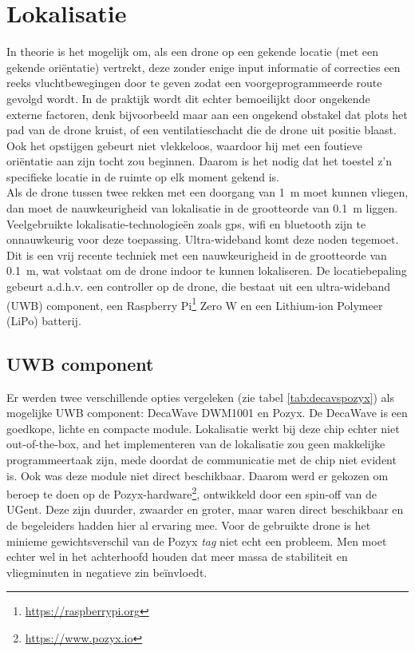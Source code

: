 
\section{Lokalisatie} \label{sec:localization}
In theorie is het mogelijk om, als een drone op een gekende locatie (met een gekende ori\"entatie) vertrekt, deze zonder enige input informatie of correcties een reeks vluchtbewegingen door te geven zodat een voorgeprogrammeerde route gevolgd wordt.
In de praktijk wordt dit echter bemoeilijkt door ongekende externe factoren, denk bijvoorbeeld maar aan een ongekend obstakel dat plots het pad van de drone kruist, of een ventilatieschacht die de drone uit positie blaast.
Ook het opstijgen gebeurt niet vlekkeloos, waardoor hij met een foutieve ori\"entatie aan zijn tocht zou beginnen.
Daarom is het nodig dat het toestel z'n specifieke locatie in de ruimte op elk moment gekend is.\\

Als de drone tussen twee rekken met een doorgang van \SI{1}{\m} moet kunnen vliegen, dan moet de nauwkeurigheid van lokalisatie in de grootteorde van \SI{0.1}{\m} liggen.
Veelgebruikte lokalisatie-technologieën zoals gps, wifi en bluetooth zijn te onnauwkeurig voor deze toepassing.
Ultra-wideband komt deze noden tegemoet.
Dit is een vrij recente techniek met een nauwkeurigheid in de grootteorde van \SI{0.1}{\m}, wat volstaat om de drone indoor te kunnen lokaliseren.
De locatiebepaling gebeurt a.d.h.v. een controller op de drone, die bestaat uit een ultra-wideband (UWB) component, een Raspberry Pi\footnote{\url{https://raspberrypi.org}} Zero W en een Lithium-ion Polymeer (LiPo) batterij.\\

\subsection{UWB component} \label{sec:uwb}
Er werden twee verschillende opties vergeleken (zie tabel \ref{tab:decavspozyx}) als mogelijke UWB component: DecaWave DWM1001 en Pozyx. De DecaWave is een goedkope, lichte en compacte module. Lokalisatie werkt bij deze chip echter niet out-of-the-box, and het implementeren van de lokalisatie zou geen makkelijke programmeertaak zijn, mede doordat de communicatie met de chip niet evident is. Ook was deze module niet direct beschikbaar. Daarom werd er gekozen om beroep te doen op de Pozyx-hardware\footnote{\url{https://www.pozyx.io}}, ontwikkeld door een spin-off van de UGent. Deze zijn duurder, zwaarder en groter, maar waren direct beschikbaar en de begeleiders hadden hier al ervaring mee. Voor de gebruikte drone is het minieme gewichtsverschil van de Pozyx \textit{tag} niet echt een probleem. Men moet echter wel in het achterhoofd houden dat meer massa de stabiliteit en vliegminuten in negatieve zin be\"invloedt.\\

